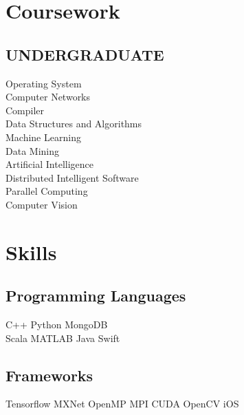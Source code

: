 \documentclass[letterpaper]{deedy-resume} %
\begin{document}
\begin{minipage}[t]{0.30\textwidth}

\section{Coursework}

\subsection{UNDERGRADUATE}
Operating System \\
Computer Networks \\
Compiler \\
Data Structures and Algorithms \\
Machine Learning \\
Data Mining \\
Artificial Intelligence\\
Distributed Intelligent Software \\
Parallel Computing \\
Computer Vision


\sectionspace %


\section{Skills}

\subsection{Programming Languages}
C++ \textbullet{} Python \textbullet{} MongoDB \\
Scala \textbullet{} MATLAB \textbullet{} Java \textbullet{} Swift\\

\sectionspace %

\subsection{Frameworks}
Tensorflow \textbullet{} MXNet \textbullet{} OpenMP \textbullet{} MPI \textbullet{} CUDA \textbullet{} OpenCV \textbullet{} iOS

\sectionspace %


\end{minipage} %
\end{document}
